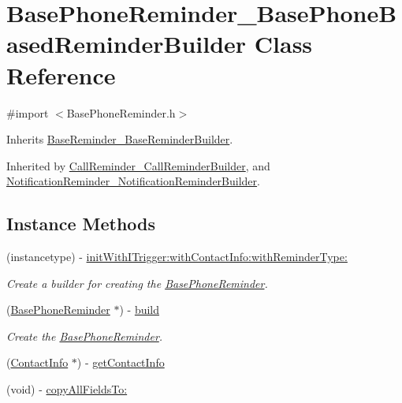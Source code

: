 \hypertarget{interface_base_phone_reminder___base_phone_based_reminder_builder}{}\section{Base\+Phone\+Reminder\+\_\+\+Base\+Phone\+Based\+Reminder\+Builder Class Reference}
\label{interface_base_phone_reminder___base_phone_based_reminder_builder}


{\ttfamily \#import $<$Base\+Phone\+Reminder.\+h$>$}



Inherits \hyperlink{interface_base_reminder___base_reminder_builder}{Base\+Reminder\+\_\+\+Base\+Reminder\+Builder}.



Inherited by \hyperlink{interface_call_reminder___call_reminder_builder}{Call\+Reminder\+\_\+\+Call\+Reminder\+Builder}, and \hyperlink{interface_notification_reminder___notification_reminder_builder}{Notification\+Reminder\+\_\+\+Notification\+Reminder\+Builder}.

\subsection*{Instance Methods}
\begin{DoxyCompactItemize}
\item 
(instancetype) -\/ \hyperlink{interface_base_phone_reminder___base_phone_based_reminder_builder_aaee86c0093f5655af55d4a34aaf42993}{init\+With\+I\+Trigger\+:with\+Contact\+Info\+:with\+Reminder\+Type\+:}
\begin{DoxyCompactList}\small\item\em Create a builder for creating the \hyperlink{interface_base_phone_reminder}{Base\+Phone\+Reminder}. \end{DoxyCompactList}\item 
(\hyperlink{interface_base_phone_reminder}{Base\+Phone\+Reminder} $\ast$) -\/ \hyperlink{interface_base_phone_reminder___base_phone_based_reminder_builder_ac1f348dfe7f94c54af6af2195baa2e9a}{build}
\begin{DoxyCompactList}\small\item\em Create the \hyperlink{interface_base_phone_reminder}{Base\+Phone\+Reminder}. \end{DoxyCompactList}\item 
(\hyperlink{interface_contact_info}{Contact\+Info} $\ast$) -\/ \hyperlink{interface_base_phone_reminder___base_phone_based_reminder_builder_a6a23f39e99f262f4a2e6dc173cd17537}{get\+Contact\+Info}
\item 
(void) -\/ \hyperlink{interface_base_phone_reminder___base_phone_based_reminder_builder_a6de6d2ae2bd9d3cd2dd645f5941692be}{copy\+All\+Fields\+To\+:}
\end{DoxyCompactItemize}

